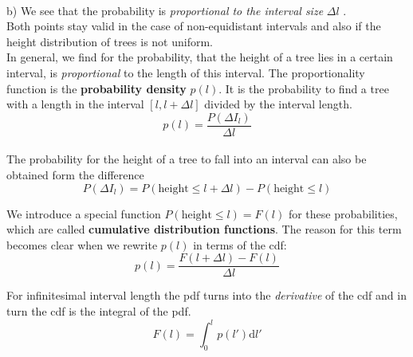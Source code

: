\documentclass[12pt, a4paper]{scrartcl}
\begin{document}
\\

b) We see that the probability is \textit{proportional to the interval size} $\Delta l$ .\\
Both points stay valid in the case of non-equidistant intervals and also if the height
distribution of trees is not uniform.\\

In general, we find for the probability, that the height of a tree lies in a certain interval, is \textit{proportional} to the length of this interval. The proportionality function is the \textbf{probability density} $p(l)$.
 It is the probability to find a tree with a length in the interval $[l,l+\Delta l]$ divided by the interval length.
 \begin{equation*}\boxed{p(l)=\frac{P(\Delta I_l)}{\Delta l}
}\end{equation*}\\
The probability for the height of a tree to fall into an interval can also be obtained
form the difference
\[P(\Delta I_l)=P(\text{height}\leq l+\Delta l)-P(\text{height} \leq l)\]

We introduce a special function $P(\text{height}\leq l)=F(l)$ for these probabilities, which are called \textbf{cumulative distribution functions}. %
The reason for this term becomes clear when we rewrite $p(l)$ in
terms of the cdf:\\
\[p(l)=\frac{F(l+\Delta l)-F(l)}{\Delta l}\]

For infinitesimal interval length the pdf turns into the \textit{derivative} of the cdf
and in turn the cdf is the integral of the pdf.\\
 \begin{equation*}\boxed{F(l)=\int_0^lp(l')\text{d}l'
 }\end{equation*}\\
\end{document}
